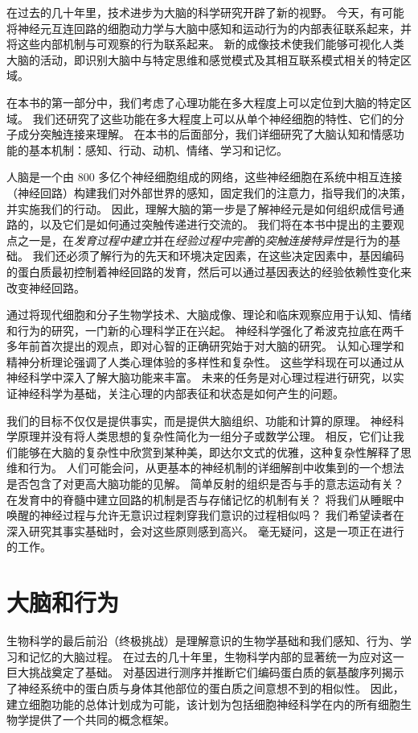 在过去的几十年里，技术进步为大脑的科学研究开辟了新的视野。
今天，有可能将神经元互连回路的细胞动力学与大脑中感知和运动行为的内部表征联系起来，并将这些内部机制与可观察的行为联系起来。
新的成像技术使我们能够可视化人类大脑的活动，即识别大脑中与特定思维和感觉模式及其相互联系模式相关的特定区域。


在本书的第一部分中，我们考虑了心理功能在多大程度上可以定位到大脑的特定区域。
我们还研究了这些功能在多大程度上可以从单个神经细胞的特性、它们的分子成分突触连接来理解。
在本书的后面部分，我们详细研究了大脑认知和情感功能的基本机制：感知、行动、动机、情绪、学习和记忆。


人脑是一个由 800 多亿个神经细胞组成的网络，这些神经细胞在系统中相互连接（神经回路）构建我们对外部世界的感知，固定我们的注意力，指导我们的决策，并实施我们的行动。
因此，理解大脑的第一步是了解神经元是如何组织成信号通路的，以及它们是如何通过突触传递进行交流的。
我们将在本书中提出的主要观点之一是，在\textit{发育过程中建立}并在\textit{经验过程中完善}的\textit{突触连接特异性}是行为的基础。
我们还必须了解行为的先天和环境决定因素，在这些决定因素中，基因编码的蛋白质最初控制着神经回路的发育，然后可以通过基因表达的经验依赖性变化来改变神经回路。


通过将现代细胞和分子生物学技术、大脑成像、理论和临床观察应用于认知、情绪和行为的研究，一门新的心理科学正在兴起。
神经科学强化了希波克拉底在两千多年前首次提出的观点，即对心智的正确研究始于对大脑的研究。
认知心理学和精神分析理论强调了人类心理体验的多样性和复杂性。
这些学科现在可以通过从神经科学中深入了解大脑功能来丰富。
未来的任务是对心理过程进行研究，以实证神经科学为基础，关注心理的内部表征和状态是如何产生的问题。


我们的目标不仅仅是提供事实，而是提供大脑组织、功能和计算的原理。
神经科学原理并没有将人类思想的复杂性简化为一组分子或数学公理。
相反，它们让我们能够在大脑的复杂性中欣赏到某种美，即达尔文式的优雅，这种复杂性解释了思维和行为。
人们可能会问，从更基本的神经机制的详细解剖中收集到的一个想法是否包含了对更高大脑功能的见解。
简单反射的组织是否与手的意志运动有关？
在发育中的脊髓中建立回路的机制是否与存储记忆的机制有关？
将我们从睡眠中唤醒的神经过程与允许无意识过程刺穿我们意识的过程相似吗？
我们希望读者在深入研究其事实基础时，会对这些原则感到高兴。
毫无疑问，这是一项正在进行的工作。





\chapter{大脑和行为} \label{chap:chap1}
生物科学的最后前沿（终极挑战）是理解意识的生物学基础和我们感知、行为、学习和记忆的大脑过程。 
在过去的几十年里，生物科学内部的显著统一为应对这一巨大挑战奠定了基础。 
对基因进行测序并推断它们编码蛋白质的氨基酸序列揭示了神经系统中的蛋白质与身体其他部位的蛋白质之间意想不到的相似性。 
因此，建立细胞功能的总体计划成为可能，该计划为包括细胞神经科学在内的所有细胞生物学提供了一个共同的概念框架。


